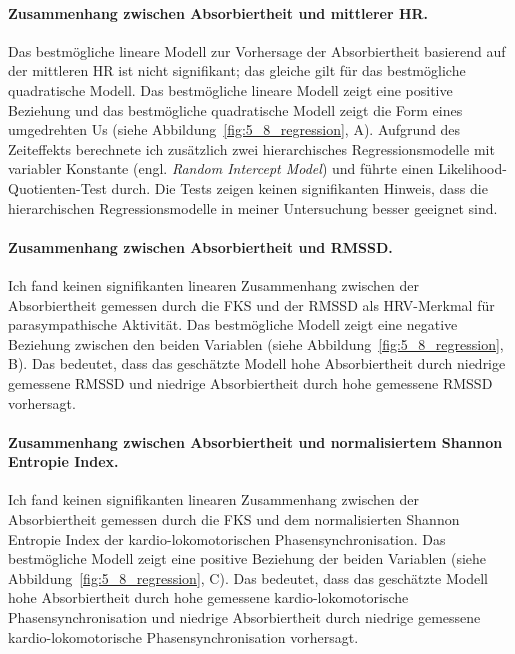 \paragraph{Zusammenhang zwischen Absorbiertheit und mittlerer HR.}
Das bestmögliche lineare Modell zur Vorhersage der Absorbiertheit basierend auf der mittleren \ac{HR} ist nicht signifikant; das gleiche gilt für das bestmögliche quadratische Modell. Das bestmögliche lineare Modell zeigt eine positive Beziehung und das bestmögliche quadratische Modell zeigt die Form eines umgedrehten Us (siehe Abbildung~\ref{fig:5_8_regression}, A). Aufgrund des Zeiteffekts berechnete ich zusätzlich zwei hierarchisches Regressionsmodelle mit variabler Konstante (engl. \emph{Random Intercept Model}) und führte einen Likelihood-Quotienten-Test durch. Die Tests zeigen keinen signifikanten Hinweis, dass die hierarchischen Regressionsmodelle in meiner Untersuchung besser geeignet sind.

\paragraph{Zusammenhang zwischen Absorbiertheit und RMSSD.}
Ich fand keinen signifikanten linearen Zusammenhang zwischen der Absorbiertheit gemessen durch die \ac{FKS} und der \acs{RMSSD} als \ac{HRV}-Merkmal für parasympathische Aktivität. Das bestmögliche Modell zeigt eine negative Beziehung zwischen den beiden Variablen (siehe Abbildung~\ref{fig:5_8_regression}, B). Das bedeutet, dass das geschätzte Modell hohe Absorbiertheit durch niedrige gemessene \acs{RMSSD} und niedrige Absorbiertheit durch hohe gemessene \acs{RMSSD} vorhersagt.

\paragraph{Zusammenhang zwischen Absorbiertheit und normalisiertem Shannon Entropie Index.}
Ich fand keinen signifikanten linearen Zusammenhang zwischen der Absorbiertheit gemessen durch die \ac{FKS} und dem normalisierten Shannon Entropie Index der kardio-lokomotorischen Phasensynchronisation. Das bestmögliche Modell zeigt eine positive Beziehung der beiden Variablen (siehe Abbildung~\ref{fig:5_8_regression}, C). Das bedeutet, dass das geschätzte Modell hohe Absorbiertheit durch hohe gemessene kardio-lokomotorische Phasensynchronisation und niedrige Absorbiertheit durch niedrige gemessene kardio-lokomotorische Phasensynchronisation vorhersagt.

